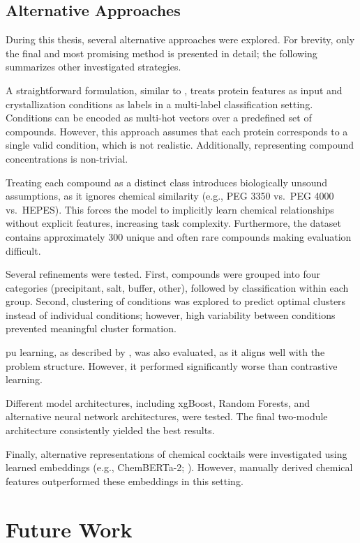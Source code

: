 \subsection*{Alternative Approaches}
During this thesis, several alternative approaches were explored. For brevity, only the final and most promising method is presented in detail; the following summarizes other investigated strategies.

A straightforward formulation, similar to \citet{Lee2019}, treats protein features as input and crystallization conditions as labels in a multi-label classification setting. Conditions can be encoded as multi-hot vectors over a predefined set of compounds. However, this approach assumes that each protein corresponds to a single valid condition, which is not realistic. Additionally, representing compound concentrations is non-trivial.

Treating each compound as a distinct class introduces biologically unsound assumptions, as it ignores chemical similarity (e.g., PEG 3350 vs.\ PEG 4000 vs.\ HEPES). This forces the model to implicitly learn chemical relationships without explicit features, increasing task complexity. Furthermore, the dataset contains approximately 300 unique and often rare compounds making evaluation difficult.

Several refinements were tested. First, compounds were grouped into four categories (precipitant, salt, buffer, other), followed by classification within each group. Second, clustering of conditions was explored to predict optimal clusters instead of individual conditions; however, high variability between conditions prevented meaningful cluster formation.

\gls{pu} learning, as described by \citet{Bekker2020}, was also evaluated, as it aligns well with the problem structure. However, it performed significantly worse than contrastive learning.

Different model architectures, including \gls{xgBoost}, Random Forests, and alternative neural network architectures, were tested. The final two-module architecture consistently yielded the best results.

Finally, alternative representations of chemical cocktails were investigated using learned embeddings (e.g., ChemBERTa-2; \citet{Ahmad2022}). However, manually derived chemical features outperformed these embeddings in this setting.


\section{Future Work}

